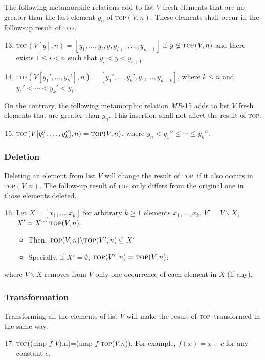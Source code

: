 \documentclass[conference]{IEEEtran}
\theoremstyle{remark}
\newtheorem*{rmk*}{Remark}
\newcommand{\Fn}{\textsc{top}}
\newcommand{\MR}{\textit{MR}}
\begin{document}
The following metamorphic relations add to list $V$ fresh elements that are no greater than the last element $y_n$ of \Fn$(V,n)$. These elements shall occur in the follow-up result of \Fn.
\begin{enumerate}[\MR-1]
\setcounter{enumi}{12}
\item \Fn$(V[y],n)=[y_1,\ldots,y_i,y,y_{i+1},\ldots,y_{n-1}]$ if $y\not\in\Fn(V,n)$ and there exists $1\leq i< n$ such that $y_i<y<y_{i+1}$.
\item \Fn$(V[y_1',\ldots,y_k'],n)=[y_1',\ldots,y_k',y_1,\ldots,y_{n-k}]$, where $k\leq n$ and $y_1'<\cdots< y_k'<y_1$.
\end{enumerate}

On the contrary, the following metamorphic relation \MR-15 adds to list $V$ fresh elements that are greater than $y_n$. This insertion shall not affect the result of \Fn.
\begin{enumerate}[\MR-1]
\setcounter{enumi}{14}
\item \Fn$(V[y_1'',\ldots,y_k''],n)=\Fn(V,n)$, where $y_n<y_1''\leq\cdots\leq y_k''$.
\end{enumerate}

\subsubsection{Deletion}
Deleting an element from list $V$ will change the result of \Fn~if it also occurs in \Fn$(V,n)$. The follow-up result of \Fn~only differs from the original one in those elements deleted.
\begin{enumerate}[\MR-1]
\setcounter{enumi}{15}
\item\label{mr-del}Let $X=[x_1,\ldots,x_k]$ for arbitrary $k\geq 1$  elements $x_1,\ldots,x_k$, $V'=V\backslash X$, $X'=X\cap\Fn(V,n)$.
\begin{itemize}
\item Then, $\Fn(V,n)\backslash\Fn(V',n)\subseteq X'$
\item Specially, if $X'=\emptyset$, $\Fn(V',n)=\Fn(V,n)$;
\end{itemize} 
\end{enumerate}
where $V\backslash X$  removes from $V$ only one occurrence of each element in $X$ (if any).

\subsubsection{Transformation}
Transforming all the elements of list $V$ will make the result of \Fn~transformed in the same way.
\begin{enumerate}[\MR-1]
\setcounter{enumi}{16}
\item \Fn((map $f$ $V$),n)=(map $f$ \Fn($V$,$n$)). For example, $f(x)=x+c$ for any constant $c$.
\end{enumerate} 
\end{document}
